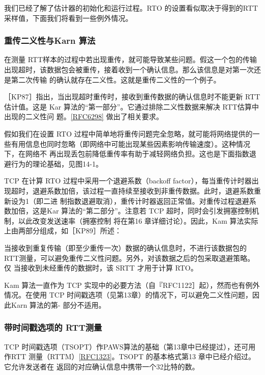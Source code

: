 我们已经了解了估计器的初始化和运行过程。RTO 的设置看似取决于得到的RTT采样值，下面我们将看到一些例外情况。
\subsubsection{重传二义性与Karn 算法}

在测量 RTT样本的过程中若出现重传，就可能导致某些问题。假这一个包的传输出现超时，该数据包会被重传，接着收到一个确认信息。那么该信息是对第一次还是第二次传输
的确认就存在二义性。这就是重传二义性的一个例子。

［KP87］指出，当出现超时重传时，接收到重传数据的确认信息时不能更新 RTT 估计值。这是 Kar
算法的“第一部分”。它通过排除二义性数据来解决 RTT估算中出现的二义性问
题。\href{https://www.rfc-editor.org/rfc/rfc6298}{[RFC6298]} 做出了相关要求。

假如我们在设置 RTO 过程中简单地将重传问题完全忽略，就可能将网络提供的一些有用信息也同时忽略（即网络中可能出现某些因素影响传输速度）。这种情况下，在网络不
再出现丢包前降低重传率有助于减轻网络负担。这也是下面指数退避行为的理论基础，见图14-1。

TCP 在计算 RTO 过程中采用一个退避系数（backoff
factor），每当重传计时器出现超时，退避系数加倍，该过程一直持续至接收到非重传数据。此时，退避系数重新设为1（即二进
制指数退避取消），重传计时器返回正常值。对重传过程退避系数加倍，这是Kar 算法的“第二部分”。注意若 TCP
超时，同时会引发拥塞控制机制，以此改变发送速率（拥塞控制
将在第16 章详细讨论）。因此，Kam 算法实际上由两部分组成，如［KP89］所述：

当接收到重复传输（即至少重传一次）数据的确认信息时，不进行该数据包的RTT测量，可以避免重传二义性问题。另外，对该数据之后的包采取退避策略。仅
当接收到未经重传的数据时，该 SRTT 才用于计算 RTO。

Kam 算法一直作为 TCP 实现中的必要方法（自『RFC1122］起），然而也有例外情况。在使用 TCP
时间戳选项（见第13章）的情况下，可以避免二义性问题，因此Karn 算法的第-
部分不适用。

\subsubsection{带时间戳选项的 RTT测量}

TCP 时间戳选项（TSOPT）作PAWS算法的基础（第13章中已经提过），还可用作RTT
测量（RTTM）\href{https://www.rfc-editor.org/rfc/rfc1323}{[RFC1323]}。TSOPT
的基本格式第13 章中已经介绍过。它允许发送者在
返回的对应确认信息中携带一个32比特的数。

